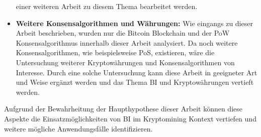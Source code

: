 \begin{itemize}
    einer weiteren Arbeit zu diesem Thema bearbeitet werden. 
    \item \textbf{Weitere Konsensalgorithmen und Währungen: }Wie eingangs zu dieser Arbeit beschrieben, wurden nur die Bitcoin
    Blockchain und der \ac{PoW} Konsensalgorithmus innerhalb dieser Arbeit analysiert. Da noch weitere Konsensalgorithmen,
    wie beispielsweise \ac{PoS}, existieren, wäre die Untersuchung weiterer Kryptowährungen und Konsensalgorithmen
    von Interesse. Durch eine solche Untersuchung kann diese Arbeit in geeigneter Art und Weise ergänzt werden und
    das Thema \ac{BI} und Kryptowährungen vertieft werden.
\end{itemize}

Aufgrund der Bewahrheitung der Haupthypothese dieser Arbeit können diese Aspekte die Einsatzmöglichkeiten von \ac{BI} im
Kryptomining Kontext vertiefen und weitere mögliche Anwendungsfälle identifizieren.
